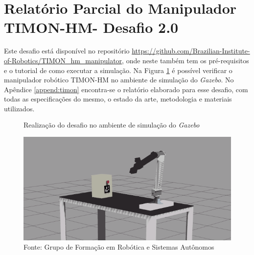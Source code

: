 




\section{Relatório Parcial do Manipulador TIMON-HM- Desafio 2.0 }
\label{sec:desafio_2}
Este desafio está disponível no repositório \url{https://github.com/Brazilian-Institute-of-Robotics/TIMON\_hm\_manipulator}, onde neste também tem os pré-requisitos e o tutorial de como executar a simulação. Na Figura \ref{fig:manipulador_simulacao} é possível verificar o manipulador robótico TIMON-HM no ambiente de simulação do \textit{Gazebo}. No Apêndice \ref{append:timon} encontra-se o relatório elaborado para esse desafio, com todas as especificações do mesmo, o estado da arte, metodologia e materiais utilizados.

\begin{figure}[H]
    \caption{Realização do desafio no ambiente de simulação do \textit{Gazebo}}
    \centering
    \includegraphics[width= \textwidth]{Figures/manipulador_simulacao.png}
    \caption*{Fonte: Grupo de Formação em Robótica e Sistemas Autônomos}
    \label{fig:manipulador_simulacao}
\end{figure}



